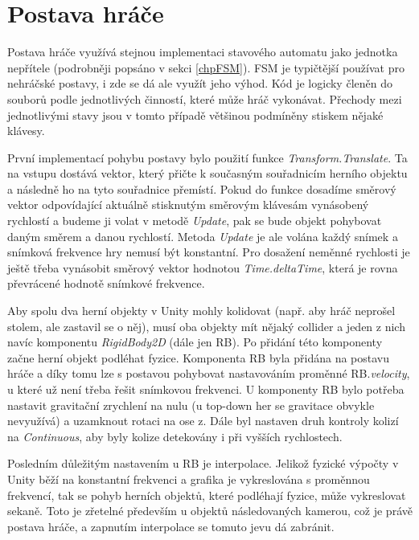 \documentclass[FM,Proj]{tulthesis}
\begin{document}
	\section{Postava hráče} %
	
	Postava hráče využívá stejnou implementaci stavového automatu jako jednotka nepřítele (podrobněji popsáno v sekci \ref{chpFSM}). FSM je typičtější používat pro nehráčské postavy, i zde se dá ale využít jeho výhod. Kód je logicky členěn do souborů podle jednotlivých činností, které může hráč vykonávat. Přechody mezi jednotlivými stavy jsou v tomto případě většinou podmíněny stiskem nějaké klávesy.
	
	První implementací pohybu postavy bylo použití funkce \textit{Transform.Translate}. Ta na vstupu dostává vektor, který přičte k současným souřadnicím herního objektu a následně ho na tyto souřadnice přemístí. Pokud do funkce dosadíme směrový vektor odpovídající aktuálně stisknutým směrovým klávesám vynásobený rychlostí a budeme ji volat v metodě \textit{Update}, pak se bude objekt pohybovat daným směrem a danou rychlostí. Metoda \textit{Update} je ale volána každý snímek a snímková frekvence hry nemusí být konstantní. Pro dosažení neměnné rychlosti je ještě třeba vynásobit směrový vektor hodnotou \textit{Time.deltaTime}, která je rovna převrácené hodnotě snímkové frekvence.
	
	Aby spolu dva herní objekty v Unity mohly kolidovat (např. aby hráč neprošel stolem, ale zastavil se o něj), musí oba objekty mít nějaký collider a jeden z nich navíc komponentu \textit{RigidBody2D} (dále jen RB). Po přidání této komponenty začne herní objekt podléhat fyzice. Komponenta RB byla přidána na postavu hráče a díky tomu lze s postavou pohybovat nastavováním proměnné RB.\textit{velocity}, u které už není třeba řešit snímkovou frekvenci. U komponenty RB bylo potřeba nastavit gravitační zrychlení na nulu (u top-down her se gravitace obvykle nevyužívá) a uzamknout rotaci na ose z. Dále byl nastaven druh kontroly kolizí na \textit{Continuous}, aby byly kolize detekovány i při vyšších rychlostech.
	
	Posledním důležitým nastavením u RB je interpolace. Jelikož fyzické výpočty v Unity běží na konstantní frekvenci a grafika je vykreslována s proměnnou frekvencí, tak se pohyb herních objektů, které podléhají fyzice, může vykreslovat sekaně. Toto je zřetelné především u objektů následovaných kamerou, což je právě postava hráče, a zapnutím interpolace se tomuto jevu dá zabránit.
	\cite{UnityDocsInterpolation}
	
\end{document}
